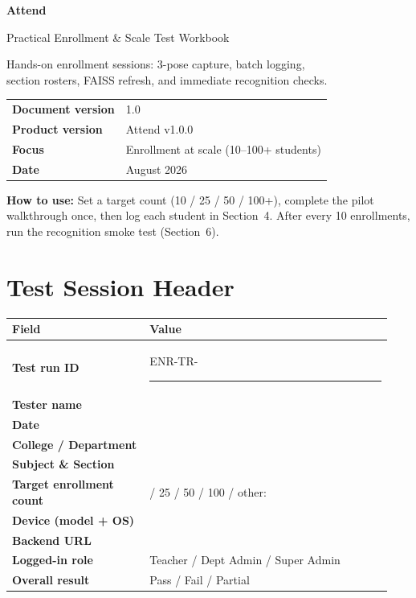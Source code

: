 \documentclass[11pt,a4paper,oneside]{article}
\makeatletter
\newenvironment{fieldtable}{%
  \smallskip\small
  \begin{tabular}{@{}>{\raggedright\arraybackslash}p{0.34\linewidth} >{\raggedright\arraybackslash}p{0.60\linewidth}@{}}
  \toprule
  \textbf{Field} & \textbf{Value} \\
  \midrule
}{%
  \bottomrule
  \end{tabular}
  \smallskip
}
\makeatother
\begin{document}
\begin{titlepage}
  \centering
  \vspace*{1.2cm}
  {\Huge\bfseries\color{AttendPrimary} Attend\par}
  \vspace{0.35cm}
  {\LARGE Practical Enrollment \& Scale Test Workbook\par}
  \vspace{1cm}
  {\large\color{AttendGray}
    Hands-on enrollment sessions: 3-pose capture, batch logging,\\
    section rosters, FAISS refresh, and immediate recognition checks.\par}
  \vfill
  \begin{tabular}{@{}ll@{}}
    \textbf{Document version} & 1.0 \\
    \textbf{Product version}  & Attend v1.0.0 \\
    \textbf{Focus}            & Enrollment at scale (10--100+ students) \\
    \textbf{Date}             & August 2026 \\
  \end{tabular}
  \vspace{1.2cm}
\end{titlepage}

\tableofcontents
\clearpage
{}

\noindent
\textbf{How to use:} Set a target count (10 / 25 / 50 / 100+), complete the pilot walkthrough once, then log each student in Section~4. After every 10 enrollments, run the recognition smoke test (Section~6).

\section{Test Session Header}

\begin{fieldtable}
\textbf{Test run ID} & ENR-TR-\rule{3.5cm}{0.4pt} \\
\textbf{Tester name} & \\
\textbf{Date} & \\
\textbf{College / Department} & \\
\textbf{Subject \& Section} & \\
\textbf{Target enrollment count} & 10 / 25 / 50 / 100 / other: \\
\textbf{Device (model + OS)} & \\
\textbf{Backend URL} & \\
\textbf{Logged-in role} & Teacher / Dept Admin / Super Admin \\
\textbf{Overall result} & Pass / Fail / Partial \\
\end{fieldtable}
\end{document}
